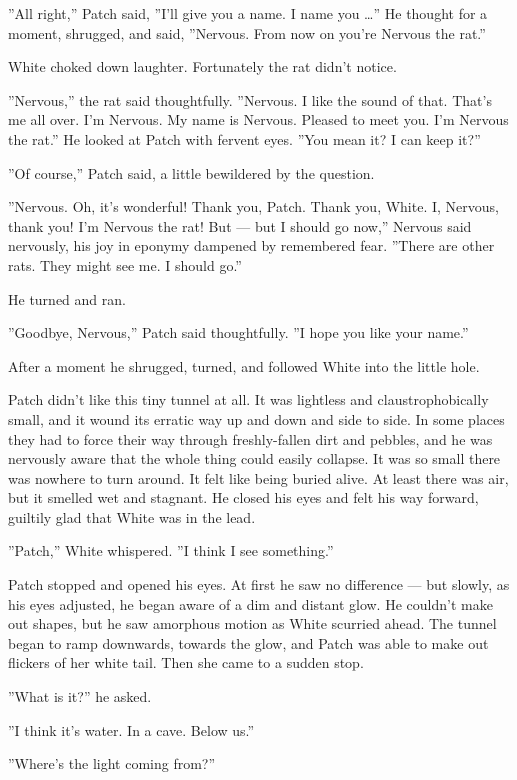 \documentclass[12pt]{book}
\begin{document}
''All right,'' Patch said, ''I'll give you a name. I name you
\ldots{}'' He thought for a moment, shrugged, and said,
''Nervous. From now on you're Nervous the rat.''

White choked down laughter. Fortunately the rat didn't notice.

''Nervous,'' the rat said thoughtfully. ''Nervous. I like the sound of
that. That's me all over. I'm Nervous. My name is Nervous. Pleased to
meet you. I'm Nervous the rat.'' He looked at Patch with fervent
eyes. ''You mean it? I can keep it?''

''Of course,'' Patch said, a little bewildered by the question.

''Nervous. Oh, it's wonderful! Thank you, Patch. Thank you, White. I,
Nervous, thank you! I'm Nervous the rat! But --- but I should go
now,'' Nervous said nervously, his joy in eponymy dampened by
remembered fear. ''There are other rats. They might see me. I should
go.''

He turned and ran.

''Goodbye, Nervous,'' Patch said thoughtfully. ''I hope you like your
name.''

After a moment he shrugged, turned, and followed White into the little
hole.

Patch didn't like this tiny tunnel at all. It was lightless and
claustrophobically small, and it wound its erratic way up and down and
side to side. In some places they had to force their way through
freshly-fallen dirt and pebbles, and he was nervously aware that the
whole thing could easily collapse. It was so small there was nowhere
to turn around. It felt like being buried alive. At least there was
air, but it smelled wet and stagnant. He closed his eyes and felt his
way forward, guiltily glad that White was in the lead.

''Patch,'' White whispered. ''I think I see something.''

Patch stopped and opened his eyes. At first he saw no difference ---
but slowly, as his eyes adjusted, he began aware of a dim and distant
glow. He couldn't make out shapes, but he saw amorphous motion as
White scurried ahead. The tunnel began to ramp downwards, towards the
glow, and Patch was able to make out flickers of her white tail. Then
she came to a sudden stop.

''What is it?'' he asked.

''I think it's water. In a cave. Below us.''

''Where's the light coming from?''
\end{document}
